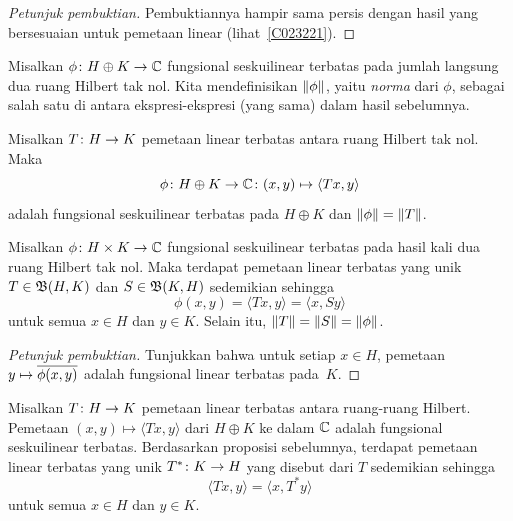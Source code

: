 \begin{proof}[\emph{Petunjuk pembuktian}] Pembuktiannya hampir sama persis dengan hasil yang bersesuaian
untuk pemetaan linear (lihat~\ref{C023221}). \ns
\end{proof}

\begin{defn} Misalkan $\phi \colon H \oplus K \rightarrow \mathbb{C}$ fungsional seskuilinear terbatas pada
jumlah langsung dua ruang Hilbert tak nol. Kita mendefinisikan $\lVert\phi\rVert$, yaitu
\emph{norma} dari $\phi$, sebagai salah satu di antara ekspresi-ekspresi (yang sama) dalam hasil sebelumnya.
\end{defn}

\begin{prop} Misalkan $T\colon H \rightarrow K$ pemetaan linear terbatas antara ruang Hilbert tak nol. Maka
   \[ \phi \colon H \oplus K \rightarrow \mathbb{C}\colon (x,y) \mapsto \langle Tx,y \rangle \]
adalah fungsional seskuilinear terbatas pada $H \oplus K$ dan $\lVert\phi\rVert = \lVert T\rVert$.
\end{prop}

\begin{prop} Misalkan $\phi \colon H \times K \rightarrow \mathbb{C}$ fungsional seskuilinear terbatas pada
hasil kali dua ruang Hilbert tak nol. Maka terdapat pemetaan linear terbatas yang unik $T \in \mathfrak{B}(H,K)$ dan
$S \in \mathfrak{B}(K,H)$ sedemikian sehingga
    \[ \phi(x,y) = \langle Tx,y \rangle = \langle x,Sy \rangle \]
untuk semua $x \in H$ dan $y \in K$. Selain itu, $\lVert T\rVert = \lVert S\rVert = \lVert\phi\rVert$.
\end{prop}

\begin{proof}[\emph{Petunjuk pembuktian}] Tunjukkan bahwa untuk setiap $x \in H$, pemetaan
$y \mapsto \overline{\phi(x,y)}$ adalah fungsional linear terbatas pada~$K$. \ns
\end{proof}

\begin{defn}\label{def000926} Misalkan $T\colon H \rightarrow K$ pemetaan linear terbatas antara ruang-ruang Hilbert. Pemetaan
$(x,y) \mapsto \langle Tx,y \rangle$ dari $H \oplus K$ ke dalam $\mathbb{C}$ adalah fungsional
seskuilinear terbatas. Berdasarkan proposisi sebelumnya, terdapat pemetaan linear terbatas yang
unik
$T^*\colon K \rightarrow H$ yang disebut  dari $T$ sedemikian sehingga
   \[ \langle Tx,y \rangle = \langle x,T^*y \rangle \]
untuk semua $x \in H$ dan $y \in K$.
\end{defn}

